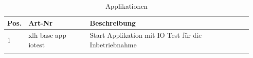 \documentclass[10pt]{datasheet}
\begin{document}
\begin{table}[h]
\begin{threeparttable}
\caption{Applikationen \xlhPlattformID}
    \begin{tabularx}{\textwidth}{l | l | l }
        \thickhline
        \textbf{Pos.} & \textbf{Art-Nr} & \textbf{Beschreibung} \\
        \hline
        1 & xlh-base-app-iotest & Start-Applikation mit IO-Test für die Inbetriebnahme \\
        \thickhline
    \end{tabularx}

\label{tab:applikationen}
\end{threeparttable}
\end{table}
\end{document}
